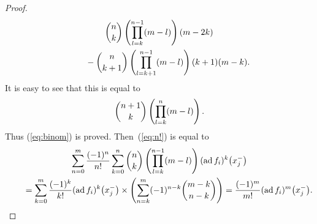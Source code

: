 \documentclass[10pt,a4paper]{amsart}
\theoremstyle{definition}
\numberwithin{equation}{section}
\DeclareMathOperator{\ad}{ad}
\begin{document}
\begin{proof}
\begin{gather*}
\begin{binom}
n
{k}
\end{binom} \left( \prod_{l=k}^{n-1} (m-l) \right) (m-2k)\\
\qquad {}-
\begin{binom}
n
{k+1}
\end{binom} \left( \prod_{l=k+1}^{n-1} (m-l) \right) (k+1)(m-k).
\end{gather*}
It is easy to see that this is equal to
\begin{gather*}
\begin{binom}
{n+1}
{k}
\end{binom} \left( \prod_{l=k}^{n} (m-l) \right).
\end{gather*}
Thus (\ref{eq:binom}) is proved. Then~(\ref{eq:n!}) is equal to
\begin{gather*}
 \sum_{n=0}^{m} \dfrac{(-1)^n}{n!} \sum_{k=0}^n \begin{binom}
n
k
\end{binom} \left(\prod_{l=k}^{n-1} (m-l)\right) (\ad f_i)^k\big(x_j^-\big) \\
 \qquad {} = \sum_{k=0}^m \dfrac{(-1)^k}{k!} (\ad f_i)^k\big(x_j^-\big) \times \left( \sum_{n=k}^{m} (-1)^{n-k} \begin{binom}
{m-k}
{n-k}
\end{binom} \right) = \dfrac{(-1)^m}{m!} (\ad f_i)^m\big(x_j^-\big).
\end{gather*}


\end{proof}
\end{document}

